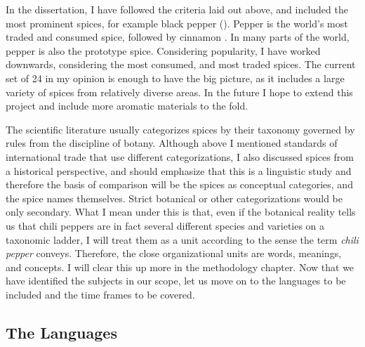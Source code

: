 
In the dissertation, I have followed the criteria laid out above, and included the most prominent spices, for example black pepper (). Pepper is the world's most traded and consumed spice, followed by cinnamon \autocite[16]{senaratne_cinnamon_2020}. In many parts of the world, pepper is also the prototype spice. Considering popularity, I have worked downwards, considering the most consumed, and most traded spices. The current set of 24 in my opinion is enough to have the big picture, as it includes a large variety of spices from relatively diverse areas. In the future I hope to extend this project and include more aromatic materials to the fold.

The scientific literature usually categorizes spices by their taxonomy governed by rules from the discipline of botany. Although above I mentioned standards of international trade that use different categorizations, I also discussed spices from a historical perspective, and should emphasize that this is a linguistic study and therefore the basis of comparison will be the spices as conceptual categories, and the spice names themselves. Strict botanical or other categorizations would be only secondary. What I mean under this is that, even if the botanical reality tells us that chili peppers are in fact several different species and varieties on a taxonomic ladder, I will treat them as a unit according to the sense the term \textit{chili pepper} conveys. Therefore, the close organizational units are words, meanings, and concepts. I will clear this up more in the methodology chapter. Now that we have identified the subjects in our scope, let us move on to the languages to be included and the time frames to be covered.


\subsection{The Languages}

